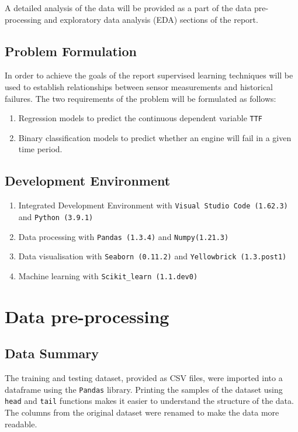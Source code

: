 \documentclass{article}
\begin{document}
A detailed analysis of the data will be provided as a part of the data pre-processing and exploratory data analysis (EDA) sections of the report. 
\subsection{Problem Formulation}
In order to achieve the goals of the report supervised learning techniques will be used to establish relationships between sensor measurements and historical failures.
The two requirements of the problem will be formulated as follows:
\begin{enumerate}[topsep=0pt]
	\item Regression models to predict the continuous dependent variable \texttt{TTF}
	\item Binary classification models to predict whether an engine will fail in a given time period.
\end{enumerate}
\subsection{Development Environment}
\begin{enumerate}[topsep=0pt]
	\item Integrated Development Environment with \texttt{Visual Studio Code (1.62.3)} and \texttt{Python (3.9.1)}
	\item Data processing with \texttt{Pandas (1.3.4)} and \texttt{Numpy(1.21.3)}
	\item Data visualisation with \texttt{Seaborn (0.11.2)} and \texttt{Yellowbrick (1.3.post1)}
	\item Machine learning with \texttt{Scikit\_learn (1.1.dev0)}
\end{enumerate}
\newpage
\section{Data pre-processing}
\subsection{Data Summary}
The training and testing dataset, provided as CSV files, were imported into a dataframe using the \texttt{Pandas} library.
Printing the samples of the dataset using \texttt{head} and \texttt{tail} functions makes it easier to understand the structure of the data.
The columns from the original dataset were renamed to make the data more readable.
\end{document}
